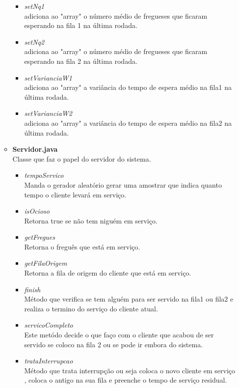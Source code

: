 \documentclass[a4paper,10pt]{article}
\begin{document}
\begin{itemize}
\begin{itemize}
\begin{itemize}
			 \item  \textit{setNq1\\}adiciona ao "array" o número médio de fregueses que ficaram esperando na fila 1 na última rodada.
			 \item  \textit{setNq2\\}adiciona ao "array" o número médio de fregueses que ficaram esperando na fila 2 na última rodada.
			 \item  \textit{setVarianciaW1\\}adiciona ao "array" a variância do tempo de espera médio na fila1  na última rodada.
			 \item  \textit{setVarianciaW2\\}adiciona ao "array" a variância do tempo de espera médio na fila2  na última rodada.
		    \end{itemize}
	      \item \textbf{Servidor.java\\}
		    Classe que faz o papel do servidor do sistema.
		    \begin{itemize}
			 \item  \textit{tempoServico\\}
                            Manda o gerador aleatório gerar uma amostrar que indica quanto tempo o cliente levará em serviço.                            
			 \item  \textit{isOcioso\\}Retorna true se não tem niguém em serviço.
			 \item  \textit{getFregues\\}Retorna o freguês que está em serviço.                            
			 \item  \textit{getFilaOrigem\\}Retorna a fila de origem do cliente que está em serviço.
			 \item  \textit{finish\\}Método que verifica se tem alguém para ser servido na fila1 ou fila2  e realiza o termino do serviço do cliente atual.
			 \item  \textit{servicoCompleto\\}Este metódo decide o que faço com o cliente que acabou de ser servido se coloco na fila 2 ou se pode ir embora do sistema.
			 \item  \textit{trataInterrupcao\\}Método que trata interrupção ou seja coloca o novo cliente em serviço , coloca o antigo na sua fila e preenche o tempo de serviço residual.

\end{itemize}
\end{itemize}
\end{itemize}
\end{document}
